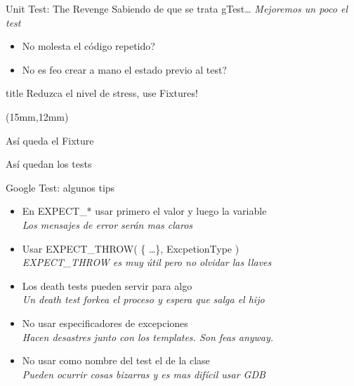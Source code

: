 \begin{frame}[t]{Unit Test: The Revenge}
Sabiendo de que se trata gTest\ldots \textit{ Mejoremos un poco el test }
\bigskip
\begin{itemize}
	\item \textquestiondown No molesta el c\'odigo repetido?
	\item \textquestiondown No es feo crear a mano el estado previo al test?
\end{itemize}

\bigskip
\begin{beamercolorbox}[sep=.1cm,shadow=true,rounded=true,center]{title}
	Reduzca el nivel de stress, use Fixtures!
\end{beamercolorbox}

\begin{textblock*}{30mm}(15mm,12mm)
\end{textblock*}
\end{frame}


\begin{frame}[shrink=2]{As\'i queda el Fixture}

\end{frame}


\begin{frame}[shrink=2]{As\'i quedan los tests}

\end{frame}

\begin{frame}{Google Test: algunos tips}
\begin{itemize}
	\item En EXPECT\_* usar primero el valor y luego la variable \\
				\textit{ Los mensajes de error ser\'an mas claros }
	\item Usar EXPECT\_THROW( \{ \ldots \}, ExcpetionType ) \\
				\textit{ EXPECT\_THROW es muy \'util pero no olvidar las llaves }
	\item Los death tests pueden servir para algo \\
				\textit{ Un death test forkea el proceso y espera que salga el hijo }
	\item No usar especificadores de excepciones \\
				\textit{ Hacen desastres junto con los templates. Son feas anyway.}
	\item No usar como nombre del test el de la clase \\
				\textit{ Pueden ocurrir cosas bizarras y es mas dif\'icil usar GDB }
\end{itemize}
\end{frame}


